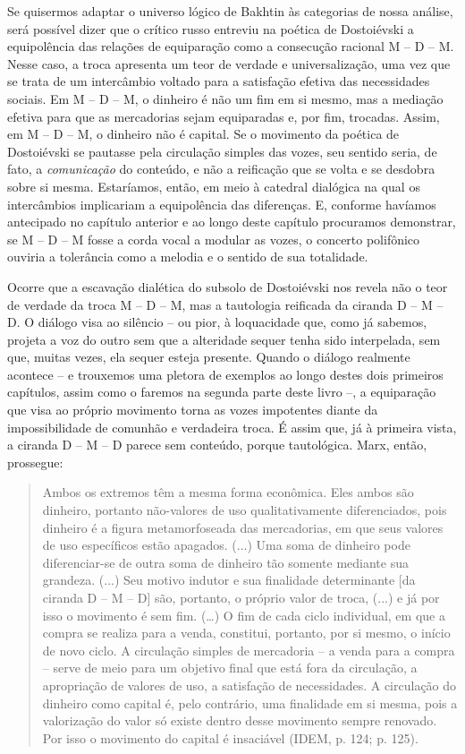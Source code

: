 Se quisermos adaptar o universo lógico de Bakhtin às categorias de nossa
análise, será possível dizer que o crítico russo entreviu na poética de
Dostoiévski a equipolência das relações de equiparação como a consecução
racional M -- D -- M. Nesse caso, a troca apresenta um teor de verdade e
universalização, uma vez que se trata de um intercâmbio voltado para a
satisfação efetiva das necessidades sociais. Em M -- D -- M, o dinheiro
é não um fim em si mesmo, mas a mediação efetiva para que as mercadorias
sejam equiparadas e, por fim, trocadas. Assim, em M -- D -- M, o
dinheiro não é capital. Se o movimento da poética de Dostoiévski se
pautasse pela circulação simples das vozes, seu sentido seria, de fato,
a \emph{comunicação} do conteúdo, e não a reificação que se volta e se
desdobra sobre si mesma. Estaríamos, então, em meio à catedral dialógica
na qual os intercâmbios implicariam a equipolência das diferenças. E,
conforme havíamos antecipado no capítulo anterior e ao longo deste
capítulo procuramos demonstrar, se M -- D -- M fosse a corda vocal a
modular as vozes, o concerto polifônico ouviria a tolerância como a
melodia e o sentido de sua totalidade.

Ocorre que a escavação dialética do subsolo de Dostoiévski nos revela
não o teor de verdade da troca M -- D -- M, mas a tautologia reificada
da ciranda D -- M -- D. O diálogo visa ao silêncio -- ou pior, à
loquacidade que, como já sabemos, projeta a voz do outro sem que a
alteridade sequer tenha sido interpelada, sem que, muitas vezes, ela
sequer esteja presente. Quando o diálogo realmente acontece -- e
trouxemos uma pletora de exemplos ao longo destes dois primeiros
capítulos, assim como o faremos na segunda parte deste livro --, a
equiparação que visa ao próprio movimento torna as vozes impotentes
diante da impossibilidade de comunhão e verdadeira troca. É assim que,
já à primeira vista, a ciranda D -- M -- D parece sem conteúdo, porque
tautológica. Marx, então, prossegue:

\begin{quote}
Ambos os extremos têm a mesma forma econômica. Eles ambos são dinheiro,
portanto não-valores de uso qualitativamente diferenciados, pois
dinheiro é a figura metamorfoseada das mercadorias, em que seus valores
de uso específicos estão apagados. (...) Uma soma de dinheiro pode
diferenciar-se de outra soma de dinheiro tão somente mediante sua
grandeza. (...) Seu motivo indutor e sua finalidade determinante {[}da
ciranda D -- M -- D{]} são, portanto, o próprio valor de troca, (...) e
já por isso o movimento é sem fim. (\ldots{}) O fim de cada ciclo
individual, em que a compra se realiza para a venda, constitui,
portanto, por si mesmo, o início de novo ciclo. A circulação simples de
mercadoria -- a venda para a compra -- serve de meio para um objetivo
final que está fora da circulação, a apropriação de valores de uso, a
satisfação de necessidades. A circulação do dinheiro como capital é,
pelo contrário, uma finalidade em si mesma, pois a valorização do valor
só existe dentro desse movimento sempre renovado. Por isso o movimento
do capital é insaciável (IDEM, p. 124; p. 125).
\end{quote}

